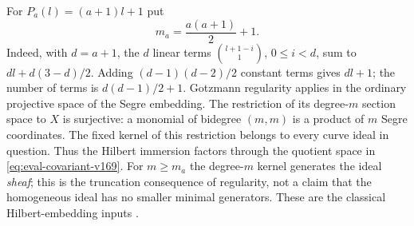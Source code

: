 For $P_a(l)=(a+1)l+1$ put
\begin{equation}\label{eq:gotzmann-size-v169}
 m_a=\frac{a(a+1)}2+1.
\end{equation}
Indeed, with $d=a+1$, the $d$ linear terms
$\binom{l+1-i}{1}$, $0\leq i<d$, sum to
$dl+d(3-d)/2$. Adding $(d-1)(d-2)/2$ constant terms gives $dl+1$;
the number of terms is $d(d-1)/2+1$. Gotzmann regularity applies in
the ordinary projective space of the Segre embedding. The restriction
of its degree-$m$ section space to $X$ is surjective: a monomial of
bidegree $(m,m)$ is a product of $m$ Segre coordinates. The fixed
kernel of this restriction belongs to every curve ideal in question.
Thus the Hilbert immersion factors through the quotient space in
\eqref{eq:eval-covariant-v169}. For $m\geq m_a$ the degree-$m$ kernel
generates the ideal \emph{sheaf}; this is the truncation consequence of
regularity, not a claim that the homogeneous ideal has no smaller
minimal generators. These are the classical Hilbert-embedding inputs
\cite{Gotzmann167}.

